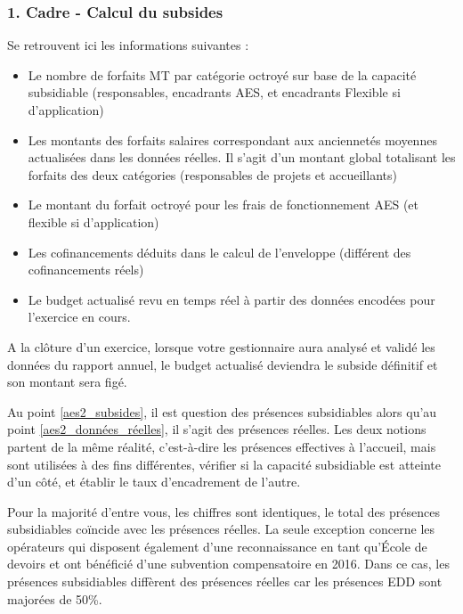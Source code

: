 \subsubsection{1. Cadre - Calcul du subsides}

Se retrouvent ici les informations suivantes :

\begin{itemize}
    \item Le nombre de forfaits MT par catégorie octroyé sur base de la capacité subsidiable (responsables, encadrants AES, et encadrants Flexible si d’application)
    \item Les montants des forfaits salaires correspondant aux anciennetés moyennes actualisées dans les données réelles. Il s’agit d’un montant global totalisant les forfaits des deux catégories (responsables de projets et accueillants)
    \item Le montant du forfait octroyé pour les frais de fonctionnement AES (et flexible si d’application)
    \item Les cofinancements déduits dans le calcul de l’enveloppe (différent des cofinancements réels) 
    \item Le budget actualisé revu en temps réel à partir des données encodées pour l’exercice en cours.

\end{itemize}

A la clôture d’un exercice, lorsque votre gestionnaire aura analysé et validé les données du rapport annuel, le budget actualisé deviendra le subside définitif et son montant sera figé. 


\begin{remarque}Au point \ref{aes2_subsides}, il est question des présences subsidiables alors qu’au point \ref{aes2_données_réelles}, il s’agit des présences réelles.  Les deux notions partent de la même réalité, c’est-à-dire les présences effectives à l’accueil, mais sont utilisées à des fins différentes, vérifier si la capacité subsidiable est atteinte d’un côté, et établir le taux d’encadrement de l’autre. 
\end{remarque}

Pour la majorité d’entre vous, les chiffres sont identiques, le total des présences subsidiables coïncide avec les présences réelles. La seule exception concerne les opérateurs qui disposent également d’une reconnaissance en tant qu’École de devoirs et ont bénéficié d’une subvention compensatoire en 2016. Dans ce cas, les présences subsidiables diffèrent des présences réelles car les présences EDD sont majorées de 50\%.

